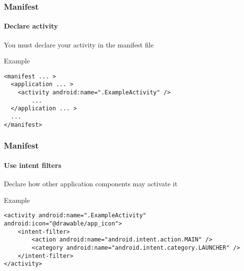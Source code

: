%
%

\begin{frame}[fragile]
  \frametitle{Manifest}
  \framesubtitle{Declare activity}
  
  You must declare your activity in the manifest file

  \begin{exampleblock}{Example}
    
\begin{lstlisting}
<manifest ... >
  <application ... >
    <activity android:name=".ExampleActivity" />
        ...
  </application ... >
  ...
</manifest>
\end{lstlisting}


  \end{exampleblock}

\end{frame}


\begin{frame}[fragile]
  \frametitle{Manifest}
  \framesubtitle{Use intent filters}
  
  Declare how other application components may activate it

  \begin{exampleblock}{Example}
\begin{lstlisting}
<activity android:name=".ExampleActivity" android:icon="@drawable/app_icon">
    <intent-filter>
        <action android:name="android.intent.action.MAIN" />
        <category android:name="android.intent.category.LAUNCHER" />
    </intent-filter>
</activity>
\end{lstlisting}
  \end{exampleblock}

\end{frame}

